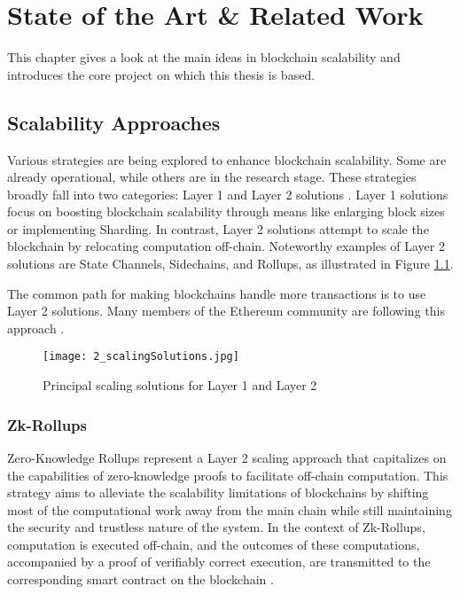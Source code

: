 \chapter{State of the Art \& Related Work}
\label{cha:chapter2}


This chapter gives a look at the main ideas in blockchain scalability and introduces the core project on which this thesis is based.

\section{Scalability Approaches}
Various strategies are being explored to enhance blockchain scalability. Some are already operational, while others are in the research stage. These strategies broadly fall into two categories: Layer 1 and Layer 2 solutions \cite{tyagi_study_2021,thibault_blockchain_2022}. Layer 1 solutions focus on boosting blockchain scalability through means like enlarging block sizes or implementing Sharding. In contrast, Layer 2 solutions attempt to scale the blockchain by relocating computation off-chain. Noteworthy examples of Layer 2 solutions are State Channels, Sidechains, and Rollups, as illustrated in Figure \ref{fig:2_scalingSolutions}.

The common path for making blockchains handle more transactions is to use Layer 2 solutions. Many members of the Ethereum community are following this approach \cite{neiheiser_practical_2023}.

\begin{figure}[ht]
  \centering
  \texttt{[image: 2\_scalingSolutions.jpg]}
  \caption[Scaling Solutions]{Principal scaling solutions for Layer 1 and Layer 2\footnotemark}  
  \label{fig:2_scalingSolutions}
\end{figure} 

\subsection{Zk-Rollups}
\label{sec:2_zkRollups}
Zero-Knowledge Rollups represent a Layer 2 scaling approach that capitalizes on the capabilities of zero-knowledge proofs to facilitate off-chain computation. This strategy aims to alleviate the scalability limitations of blockchains by shifting most of the computational work away from the main chain while still maintaining the security and trustless nature of the system. In the context of Zk-Rollups, computation is executed off-chain, and the outcomes of these computations, accompanied by a proof of verifiably correct execution, are transmitted to the corresponding smart contract on the blockchain \cite{tyagi_study_2021}.


